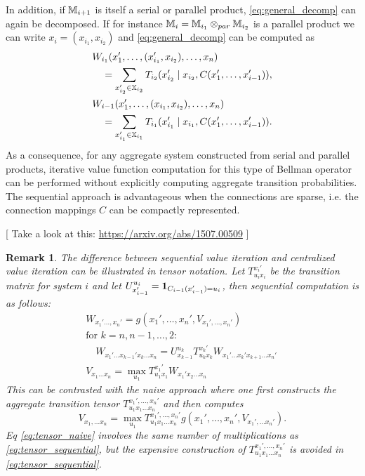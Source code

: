 \documentclass[conference]{IEEEtran}
\newtheorem{remark}{Remark}
\newcommand{\sofie}[1]{{\color{orange}[ #1 ]}}
\begin{document}
In addition, if $\mathbb{M}_{i+1}$ is itself a serial or parallel product, \eqref{eq:general_decomp} can again be decomposed. If for instance $\mathbb{M}_{i} = \mathbb{M}_{i_1} \otimes_{par} \mathbb{M}_{i_2}$ is a parallel product we can write $x_i = (x_{i_1}, x_{i_2})$ and \eqref{eq:general_decomp} can be computed as
\begin{equation}
\begin{aligned}
  & W_{i_1}(x_1', \ldots, (x_{i_1}', x_{i_2}), \ldots, x_n) \\
  & \quad = \sum_{x_{i_2}' \in \mathbb{X}_{i_2}} T_{i_2}(x_{i_2}' \mid x_{i_2}, C(x_1', \ldots, x_{i-1}') ), \\
  & W_{i-1}(x_1', \ldots, (x_{i_1}, x_{i_2}), \ldots, x_n) \\
  & \quad = \sum_{x_{i_1}' \in \mathbb{X}_{i_1}} T_{i_1}(x_{i_1}' \mid x_{i_1}, C(x_1', \ldots, x_{i-1}') ). \\
\end{aligned}
\end{equation}
As a consequence, for any aggregate system constructed from serial and parallel products, iterative value function computation for this type of Bellman operator can be performed without explicitly computing aggregate transition probabilities. The sequential approach is advantageous when the connections are sparse, i.e. the connection mappings $C$ can be compactly represented.

\sofie{Take a look at this: \url{https://arxiv.org/abs/1507.00509}}
\begin{remark}
  The difference between sequential value iteration and centralized value iteration can be illustrated in tensor notation. Let $T_{u_i x_i}^{x_i'}$ be the transition matrix for system $i$ and let $U_{x'_{i-1}}^{u_i} = \mathbf{1}_{C_{i-1}(x'_{i-1}) = u_i}$, then sequential computation is as follows:
  \begin{equation}
  \label{eq:tensor_sequential}
  \begin{aligned}
      & W_{x_1' \ldots, x_n'} = g(x_1', \ldots, x_n', V_{x_1', \ldots, x_n'}) \\
      & \text{for $k = n, n-1, \ldots, 2$}: \\
      & \quad W_{x_1'\ldots x_{k-1}' x_{k} \ldots x_n} = U_{x_{k-1}}^{u_k} T_{u_k x_k}^{x_k'}  W_{x_1'\ldots x_k' x_{k+1} \ldots x_n'} \quad \\
      & V_{x_1\ldots x_n} = \max_{u_1} T^{x_1'}_{u_1x_1} W_{x_1' x_2 \ldots x_n}
  \end{aligned}
  \end{equation}
  This can be contrasted with the naive approach where one first constructs the aggregate transition tensor $T_{u_1 x_1 \ldots x_n}^{x_1', \ldots, x_n'}$ and then computes
  \begin{equation}
  \label{eq:tensor_naive}
    V_{x_1, \ldots x_n} = \max_{u_1} T_{u_1 x_1 \ldots x_n}^{x_1', \ldots, x_n'} g(x_1', \ldots, x_n', V_{x_1', \ldots x_n'}).
  \end{equation}
  Eq \eqref{eq:tensor_naive} involves the same number of multiplications as \eqref{eq:tensor_sequential}, but the expensive construction of $T_{u_1 x_1 \ldots x_n}^{x_1', \ldots, x_n'}$ is avoided in \eqref{eq:tensor_sequential}.
\end{remark}
\end{document}
